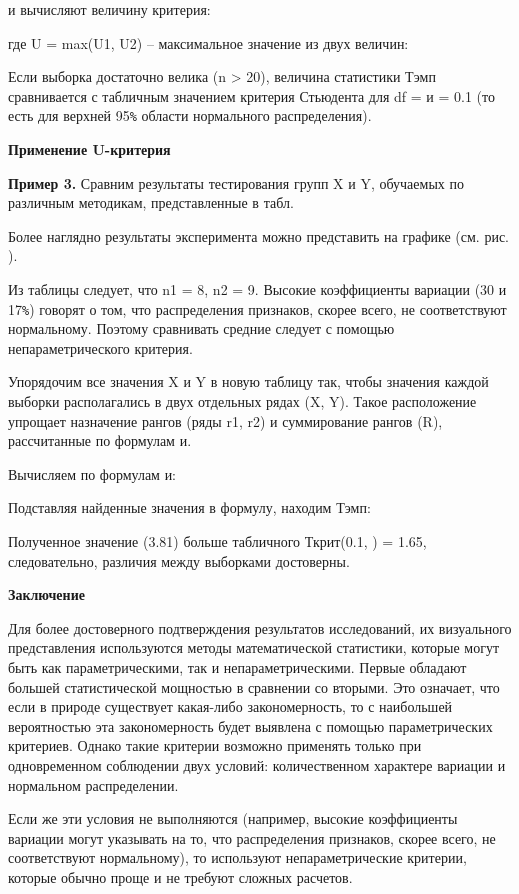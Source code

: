 \documentclass[12pt]{article}
\begin{document}
и вычисляют величину критерия:

где U = max(U1, U2) – максимальное значение из двух величин:
                                           
Если выборка достаточно велика (n > 20), величина статистики Тэмп сравнивается с табличным значением критерия Стьюдента для df =  и  = 0.1 (то есть для верхней 95\verb!%! области нормального распределения).

\medskip
\textbf{Применение U-критерия}

\medskip
\textbf{Пример 3.} Сравним результаты тестирования групп X и Y, обучаемых по различным методикам, представленные в табл. 

Более наглядно результаты эксперимента можно представить на графике (см. рис. ).
 
Из таблицы  следует, что n1 = 8, n2 = 9. Высокие коэффициенты вариации (30 и 17\verb!%!) говорят о том, что распределения признаков, скорее всего, не соответствуют нормальному. Поэтому сравнивать средние следует с помощью непараметрического критерия.

Упорядочим все значения X и Y в новую таблицу  так, чтобы значения каждой выборки располагались в двух отдельных рядах (X, Y). Такое расположение упрощает назначение рангов (ряды r1, r2) и суммирование рангов (R), рассчитанные по формулам  и.

Вычисляем по формулам  и:
  
Подставляя найденные значения в формулу, находим Тэмп:
  
Полученное значение (3.81) больше табличного Ткрит(0.1, ) = 1.65, следовательно, различия между выборками достоверны.

\medskip
\textbf{Заключение}

\medskip
Для более достоверного подтверждения результатов исследований, их визуального представления используются методы математической статистики, которые могут быть как параметрическими, так и непараметрическими.
Первые обладают большей статистической мощностью в сравнении со вторыми. Это означает, что если в природе существует какая-либо закономерность, то с наибольшей вероятностью эта закономерность будет выявлена с помощью параметрических критериев. Однако такие критерии возможно применять только при одновременном соблюдении двух условий: количественном характере вариации и нормальном распределении.

Если же эти условия не выполняются (например, высокие коэффициенты вариации могут указывать на то, что распределения признаков, скорее всего, не соответствуют нормальному), то используют непараметрические критерии, которые обычно проще и не требуют сложных расчетов.
\end{document}

